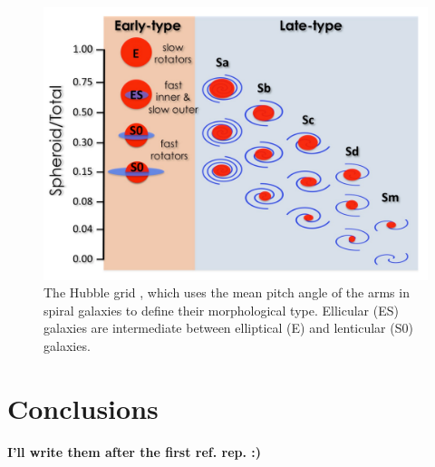 \documentclass[useAMS,usenatbib,article]{mn2e}
\begin{document}

\begin{figure}[h]
\begin{center}
\includegraphics[width=\columnwidth]{images/Hubble-grid-2/Hubblegrid.pdf}
\caption{The Hubble grid \citep{graham2014review}, 
which uses the mean pitch angle of the arms in spiral galaxies to define their morphological type. 
Ellicular (ES) galaxies are intermediate between elliptical (E) and lenticular (S0) galaxies. }
\label{fig:grid}
\end{center}
\end{figure}

\section{Conclusions}
{\bf I'll write them after the first ref. rep. :) }
\end{document}
